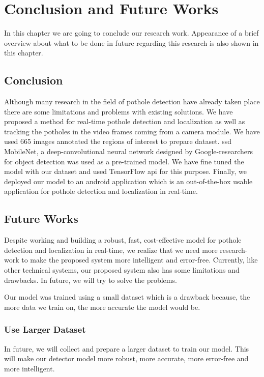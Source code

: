 \chapter{Conclusion and Future Works}
    In this chapter we are going to conclude our research work. Appearance of a brief overview about what to be done in future regarding this research is also shown in this chapter.
    
    \section{Conclusion}
        Although many research in the field of pothole detection have already taken place there are some limitations and problems with existing solutions. We have proposed a method for real-time pothole detection and localization as well as tracking the potholes in the video frames coming from a camera module. We have used 665 images annotated the regions of interest to prepare dataset. \acrfull{ssd} MobileNet, a deep-convolutional neural network designed by Google-researchers for object detection was used as a pre-trained model. We have fine tuned the model with our dataset and used TensorFlow \acrshort{api} for this purpose. Finally, we deployed our model to an android application which is an out-of-the-box usable application for pothole detection and localization in real-time.
    
    \section{Future Works}
        Despite working and building a robust, fast, cost-effective model for pothole detection and localization in real-time, we realize that we need more research-work to make the proposed system more intelligent and error-free. Currently, like other technical systems, our proposed system also has some limitations and drawbacks. In future, we will try to solve the problems.
        
        Our model was trained using a small dataset which is a drawback because, the more data we train on, the more accurate the model would be.
        
        \subsection{Use Larger Dataset}
            In future, we will collect and prepare a larger dataset to train our model. This will make our detector model more robust, more accurate, more error-free and more intelligent.
            
